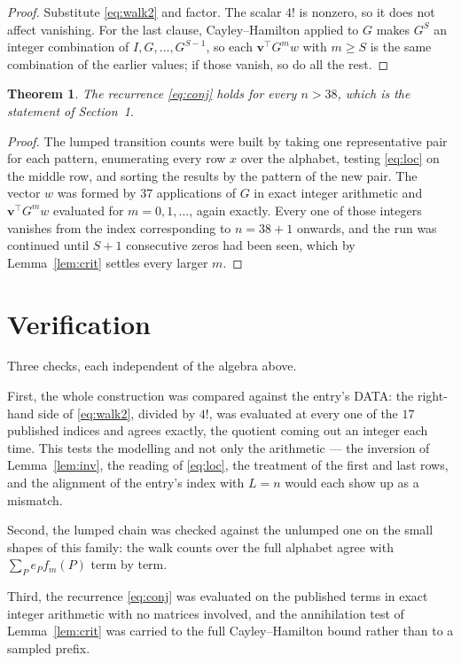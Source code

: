 \documentclass[11pt,a4paper]{article}
\theoremstyle{plain}
\newtheorem{theorem}{Theorem}
\theoremstyle{definition}
\begin{document}
\begin{proof}
Substitute \eqref{eq:walk2} and factor. The scalar $4!$ is nonzero, so it does not
affect vanishing. For the last clause, Cayley--Hamilton applied to $G$ makes $G^{S}$ an
integer combination of $I,G,\dots,G^{S-1}$, so each $\mathbf{v}^{\!\top}G^{m}w$ with
$m\ge S$ is the same combination of the earlier values; if those vanish, so do all the rest.
\end{proof}

\begin{theorem}
The recurrence \eqref{eq:conj} holds for every $n>38$, which is the statement of
Section~1.
\end{theorem}

\begin{proof}
The lumped transition counts were built by taking one representative pair for each pattern,
enumerating every row $x$ over the alphabet, testing \eqref{eq:loc} on the middle
row, and sorting the results by the pattern of the new pair. The vector $w$ was formed by
$37$ applications of $G$ in exact integer arithmetic and $\mathbf{v}^{\!\top}G^{m}w$
evaluated for $m=0,1,\dots$, again exactly. Every one of those integers vanishes from the
index corresponding to $n=38+1$ onwards, and the run was continued until $S+1$
consecutive zeros had been seen, which by Lemma~\ref{lem:crit} settles every larger $m$.
\end{proof}

\section{Verification}

Three checks, each independent of the algebra above.

First, the whole construction was compared against the entry's DATA: the right-hand side of
\eqref{eq:walk2}, divided by $4!$, was evaluated at every one of the $17$
published indices and agrees exactly, the quotient coming out an integer each time. This
tests the modelling and not only the arithmetic --- the inversion of Lemma~\ref{lem:inv},
the reading of \eqref{eq:loc}, the treatment of the first and last rows, and the
alignment of the entry's index with $L=n$ would each show up as a mismatch.

Second, the lumped chain was checked against the unlumped one on the small shapes of this
family: the walk counts over the full alphabet agree with $\sum_P e_Pf_m(P)$ term by term.

Third, the recurrence \eqref{eq:conj} was evaluated on the published terms in exact integer
arithmetic with no matrices involved, and the annihilation test of Lemma~\ref{lem:crit} was
carried to the full Cayley--Hamilton bound rather than to a sampled prefix.
\end{document}
